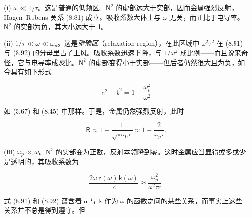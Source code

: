 (i) $\omega\ll 1/\tau$。这是普通的低频区。$\mathsf{N}^2$ 的虚部远大于实部，因而金属强烈反射，Hagen--Rubens 关系 (8.81) 成立。吸收系数大体上与 $\omega$ 无关，而正比于电导率。$\mathsf{N}^2$ 的实部为负，其大小远大于 1。

(ii) $1/\tau\ll\omega\ll\omega_p$。这是\emph{弛豫区}（relaxation region），在此区域中 $\omega^2\tau^2$ 在 (8.91) 与 (8.92) 的分母里占了上风。吸收系数迅速下降，与 $1/\omega^2$ 成比例——而且说来奇怪，它与电导率成\emph{反}比。$\mathsf{N}^2$ 的虚部变得小于实部——但后者仍然很大且为负，如今具有如下形式

\begin{equation*}
\mathsf{n}^2-\mathsf{k}^2 = 1-\frac{\omega_p^2}{\omega^2}
\tag{8.93}
\end{equation*}

如 (5.67) 和 (8.45) 中那样。于是，金属仍然强烈反射，此时

\begin{equation*}
\mathsf{R} \approx 1-\frac{1}{\sqrt{\pi\sigma_0\tau}} \approx 1-\frac{2}{\omega_p\tau}.
\tag{8.94}
\end{equation*}


(iii) $\omega_p\ll\omega$。$\mathsf{N}^2$ 的实部变为正数，反射本领降到零。这时金属应当显得或多或少是透明的，其吸收系数为

\begin{equation*}
\frac{2\omega\,\mathsf{n}(\omega)\,\mathsf{k}(\omega)}{c} \approx \frac{\omega_p^2}{\omega^2\tau c}.
\tag{8.95}
\end{equation*}

式 (8.91) 和 (8.92) 蕴含着 $\mathsf{n}$ 与 $\mathsf{k}$ 作为 $\omega$ 的函数之间的某些关系，而事实上这些关系并不总是得到遵守。但
